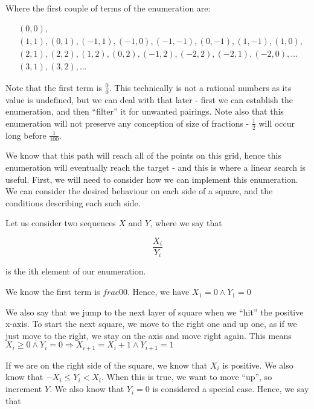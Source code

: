 \documentclass{article}
\begin{document}
    Where the first couple of terms of the enumeration are:

    \begin{equation}
    \begin{split}
    &(0, 0),\\
    &(1, 1), (0, 1), (-1, 1), (-1, 0), (-1, -1), (0, -1), (1, -1), (1, 0),\\
    &(2, 1), (2, 2), (1, 2), (0, 2), (-1, 2), (-2, 2), (-2, 1), (-2, 0), \ldots\\
    &(3, 1), (3, 2), \ldots
    \end{split}
    \end{equation}

    Note that the first term is $\frac{0}{0}$. This technically is not a
    rational numbers as its value is undefined, but we can deal with that later
    - first we can establish the enumeration, and then ``filter'' it for
    unwanted pairings. Note also that this enumeration will not preserve any
    conception of size of fractions - $\frac{1}{2}$ will occur long before
    $\frac{1}{100}$.

    We know that this path will reach all of the points on this grid, hence
    this enumeration will eventually reach the target - and this is where a
    linear search is useful. First, we will need to consider how we can
    implement this enumeration. We can consider the desired behaviour on each
    side of a square, and the conditions describing each such side.

    Let us consider two sequences $X$ and $Y$, where we say that

    \begin{equation}
    \frac{X_i}{Y_i}
    \end{equation}

    is the ith element of our enumeration.

    We know the first term is $frac{0}{0}$. Hence, we have $X_1 = 0 \wedge Y_1
    = 0$

    We also say that we jump to the next layer of square when we ``hit'' the
    positive x-axis. To start the next square, we move to the right one and up
    one, as if we just move to the right, we stay on the axis and move right
    again. This means $X_i \geq 0 \wedge Y_i = 0 \Rightarrow X_{i +
    1} = X_i + 1 \wedge Y_{i + 1} = 1$

    If we are on the right side of the square, we know that $X_i$ is positive.
    We also know that $-X_i \leq Y_i < X_i$. When this is true, we want to move
    ``up'', so increment $Y$. We also know that $Y_i = 0$ is considered a
    special case. Hence, we say that
\end{document}
